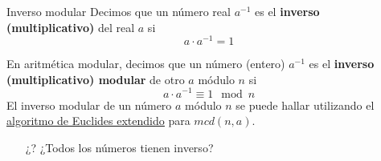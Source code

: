 \documentclass[10pt]{beamer} %
\begin{document}
\begin{frame}{Inverso modular}
Decimos que un número real $a^{-1}$ es el \textbf{inverso (multiplicativo)} del real $a$ si \[a\cdot a^{-1} = 1\]\par
En aritmética modular, decimos que un número (entero) $a^{-1}$ es el \textbf{inverso (multiplicativo) modular} de otro $a$ módulo $n$ si \[a\cdot a^{-1} \equiv 1 \mod n\]
El inverso modular de un número $a$ módulo $n$ se puede hallar utilizando el \underline{\href{https://es.wikipedia.org/wiki/Algoritmo\_de\_Euclides\#Algoritmo\_de\_Euclides\_extendido}{algoritmo de Euclides extendido}} para $mcd(n, a)$.
\begin{itemize}
    \item[¿?] ¿Todos los números tienen inverso?
\end{itemize}
\end{frame}
\end{document}
